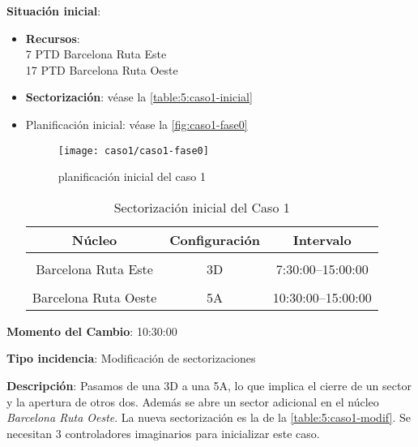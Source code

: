 \textbf{Situación inicial}:
\begin{itemize}[label={}]
		
	\item \textbf{Recursos}: \\
	7 PTD Barcelona Ruta Este \\
	17 PTD Barcelona Ruta Oeste
	
	
	\item \textbf{Sectorización}: véase la \autoref{table:5:caso1-inicial}
	
	\item Planificación inicial: véase la \autoref{fig:caso1-fase0}
	
	\begin{figure}[h]
		\centering
		\texttt{[image: caso1/caso1-fase0]}
		\caption{planificación inicial del caso 1}
		\label{fig:caso1-fase0}
	\end{figure}
	
	\begin{table}[h]
		\centering
		\caption{Sectorización inicial del Caso 1}
		\begin{tabular}{ccc}
			\hline
			\textbf{Núcleo}      & \textbf{Configuración} & \textbf{Intervalo}   \\ \hline
			\multicolumn{1}{l}{} & \multicolumn{1}{l}{}   & \multicolumn{1}{l}{} \\
			Barcelona Ruta Este  & 3D                     & 7:30:00--15:00:00    \\
			\multicolumn{1}{l}{} & \multicolumn{1}{l}{}   & \multicolumn{1}{l}{} \\
			Barcelona Ruta Oeste & 5A                     & 10:30:00--15:00:00   \\ \hline
		\end{tabular}
		\label{table:5:caso1-inicial}
	\end{table}
	
\end{itemize}

\textbf{Momento del Cambio}: 10:30:00

\textbf{Tipo incidencia}: Modificación de sectorizaciones

\textbf{Descripción}: Pasamos de una 3D a una 5A, lo que implica el cierre de un sector y la apertura de otros dos. Además se abre un sector adicional en el núcleo \textit{Barcelona Ruta Oeste}. La nueva sectorización es la de la \autoref{table:5:caso1-modif}. Se necesitan 3 controladores imaginarios para inicializar este caso.

